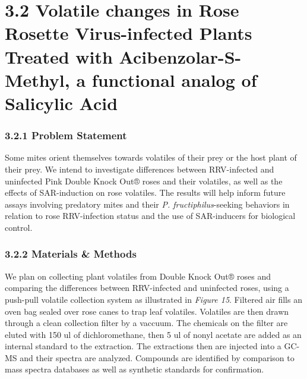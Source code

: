 \documentclass[12pt,final,CPage]{ufthesis}
\begin{document}
{  \hypertarget{swirskii-trials}{%
  \section{3.2 Volatile changes in Rose Rosette Virus-infected Plants Treated with Acibenzolar-S-Methyl, a functional analog of Salicylic Acid}\label{swirskii-trials}}

  \hypertarget{problem-statement-1}{%
  \subsubsection{3.2.1 Problem Statement}\label{problem-statement-1}}

  Some mites orient themselves towards volatiles of their prey or the host plant of their prey. We intend to investigate differences between RRV-infected and uninfected Pink Double Knock Out® roses and their volatiles, as well as the effects of SAR-induction on rose volatiles. The results will help inform future assays involving predatory mites and their \emph{P. fructiphilus}-seeking behaviors in relation to rose RRV-infection status and the use of SAR-inducers for biological control.

  \hypertarget{materials-methods-1}{%
  \subsubsection{3.2.2 Materials \& Methods}\label{materials-methods-1}}

  We plan on collecting plant volatiles from Double Knock Out® roses and comparing the differences between RRV-infected and uninfected roses, using a push-pull volatile collection system as illustrated in \emph{Figure 15}. Filtered air fills an oven bag sealed over rose canes to trap leaf volatiles. Volatiles are then drawn through a clean collection filter by a vaccuum. The chemicals on the filter are eluted with 150 ul of dichloromethane, then 5 ul of nonyl acetate are added as an internal standard to the extraction. The extractions then are injected into a GC-MS and their spectra are analyzed. Compounds are identified by comparison to mass spectra databases as well as synthetic standards for confirmation.

}
\end{document}
